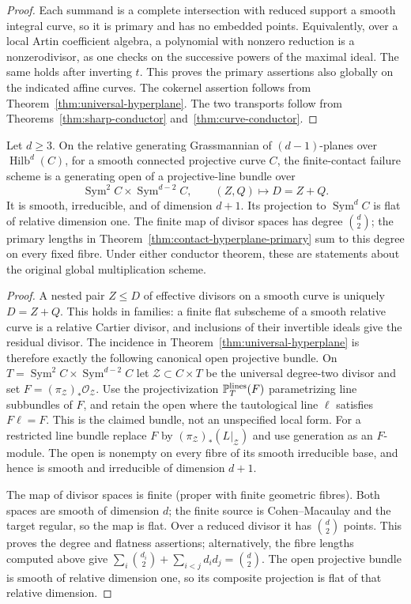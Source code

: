\begin{proof}
Each summand is a complete intersection with reduced support a
smooth integral curve, so it is primary and has no embedded points.
Equivalently, over a local Artin coefficient algebra, a polynomial
with nonzero reduction is a nonzerodivisor, as one checks on the
successive powers of the maximal ideal. The same holds after
inverting $t$. This proves the primary assertions also globally on
the indicated affine curves. The cokernel assertion follows from
Theorem~\ref{thm:universal-hyperplane}. The two transports follow
from Theorems~\ref{thm:sharp-conductor} and~\ref{thm:curve-conductor}.
\end{proof}

\begin{theorem}\label{thm:moving-hyperplane}
Let $d\ge3$. On the relative generating Grassmannian of $(d-1)$-planes over
$\operatorname{Hilb}^d(C)$, for a smooth connected projective curve $C$, the finite-contact
failure scheme is a generating open of a projective-line bundle over
\[
 \operatorname{Sym}^2 C\times\operatorname{Sym}^{d-2} C,
 \qquad (Z,Q)\longmapsto D=Z+Q.
\]
It is smooth, irreducible, and of dimension $d+1$. Its projection
to $\operatorname{Sym}^d C$ is flat of relative dimension one.
The finite map of divisor spaces has degree $\binom d2$; the primary
lengths in Theorem~\ref{thm:contact-hyperplane-primary} sum to this
degree on every fixed fibre. Under either conductor theorem, these
are statements about the original global multiplication scheme.
\end{theorem}
\begin{proof}
A nested pair $Z\le D$ of effective divisors on a smooth curve is
uniquely $D=Z+Q$. This holds in families: a finite flat subscheme
of a smooth relative curve is a relative Cartier divisor, and
inclusions of their invertible ideals give the residual divisor.
The incidence in Theorem~\ref{thm:universal-hyperplane} is therefore
exactly the following canonical open projective bundle.
On $T=\operatorname{Sym}^2 C\times\operatorname{Sym}^{d-2} C$
let $\mathcal Z\subset C\times T$ be the universal degree-two divisor
and set $F=(\pi_{\mathcal Z})_*\mathcal O_{\mathcal Z}$.
Use the projectivization $\mathbb P_T^{\rm lines}(F)$ parametrizing line
subbundles of $F$, and retain the open where the tautological line
$\ell$ satisfies $F\ell=F$. This is the claimed bundle, not an
unspecified local form. For a restricted line bundle replace $F$
by $(\pi_{\mathcal Z})_*(L|_{\mathcal Z})$ and use generation as an
$F$-module. The open is nonempty on every
fibre of its smooth irreducible base, and hence is smooth and
irreducible of dimension $d+1$.

The map of divisor spaces is finite (proper with finite geometric
fibres). Both spaces are smooth of dimension $d$; the finite source
is Cohen--Macaulay and the target regular, so the map is flat.
Over a reduced divisor it has $\binom d2$ points. This proves the
degree and flatness assertions; alternatively, the fibre lengths
computed above give $\sum_i\binom{d_i}2+\sum_{i<j}d_id_j=\binom d2$.
The open projective bundle is smooth of relative dimension one,
so its composite projection is flat of that relative dimension.
\end{proof}

